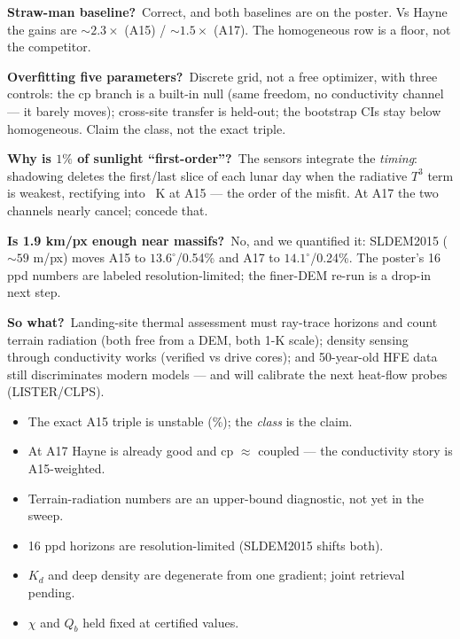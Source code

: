 \documentclass[11pt]{article}
\newcommand{\shead}[1]{\medskip\noindent{\color{teal}\large\bfseries #1}\par
  \nobreak\vspace{-2pt}{\color{teal}\rule{\linewidth}{0.6pt}}\par\smallskip}
\begin{document}
\smallskip\noindent\textbf{\color{coral}Straw-man baseline?}\ Correct, and both
baselines are on the poster. Vs Hayne the gains are ${\sim}2.3\times$ (A15) /
${\sim}1.5\times$ (A17). The homogeneous row is a floor, not the competitor.

\smallskip\noindent\textbf{\color{coral}Overfitting five parameters?}\ Discrete
grid, not a free optimizer, with three controls: the cp branch is a built-in
null (same freedom, no conductivity channel --- it barely moves); cross-site
transfer is held-out; the bootstrap CIs stay below homogeneous. Claim the
class, not the exact triple.

\smallskip\noindent\textbf{\color{coral}Why is $1\%$ of sunlight ``first-order''?}\
The sensors integrate the \emph{timing}: shadowing deletes the first/last slice
of each lunar day when the radiative $T^3$ term is weakest, rectifying into
\shadowcoolAfif\ K at A15 --- the order of the misfit. At A17 the two channels
nearly cancel; concede that.

\smallskip\noindent\textbf{\color{coral}Is 1.9 km/px enough near massifs?}\ No, and
we quantified it: SLDEM2015 (${\sim}59$ m/px) moves A15 to $13.6^\circ$/0.54\%
and A17 to $14.1^\circ$/0.24\%. The poster's 16 ppd numbers are labeled
resolution-limited; the finer-DEM re-run is a drop-in next step.

\smallskip\noindent\textbf{\color{coral}So what?}\ Landing-site thermal
assessment must ray-trace horizons and count terrain radiation (both free from
a DEM, both 1-K scale); density sensing through conductivity works (verified vs
drive cores); and 50-year-old HFE data still discriminates modern models ---
and will calibrate the next heat-flow probes (LISTER/CLPS).

\shead{Concede these before you're asked}
\begin{itemize}
  \item The exact A15 triple is unstable (\stabcKAfif\%); the \emph{class} is the claim.
  \item At A17 Hayne is already good and cp $\approx$ coupled --- the
    conductivity story is A15-weighted.
  \item Terrain-radiation numbers are an upper-bound diagnostic, not yet in the sweep.
  \item 16 ppd horizons are resolution-limited (SLDEM2015 shifts both).
  \item $K_d$ and deep density are degenerate from one gradient; joint retrieval pending.
  \item $\chi$ and $Q_b$ held fixed at certified values.
\end{itemize}
\end{document}
